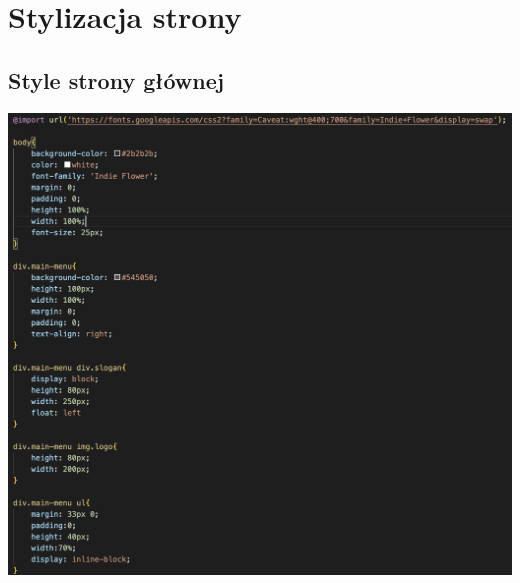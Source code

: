 \documentclass[12pt, letterpaper]{article}
\begin{document}
\section{Stylizacja strony}

\subsection{Style strony głównej}

\begin{center}
	\includegraphics[scale=0.6]{style1}
\end{center}
\end{document}
